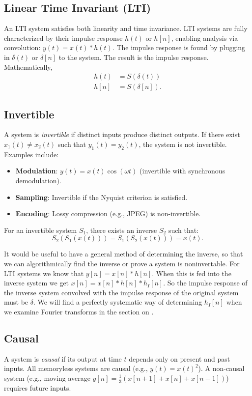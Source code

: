\subsection{Linear Time Invariant (LTI)}
An LTI system satisfies both linearity and time invariance.
LTI systems are fully characterized by their impulse response
\( h(t) \) or \( h[n] \), enabling analysis via convolution:
\( y(t) = x(t) * h(t) \). The impulse response is found by
plugging in $\delta(t)$ or $\delta[n]$ to the system. The result
is the impulse response. Mathematically,
\begin{align}
    h(t) & = S(\delta(t))  \\
    h[n] & = S(\delta[n]).
\end{align}

\subsection{Invertible}
A system is \emph{invertible} if distinct inputs produce distinct outputs. If there exist \( x_1(t) \neq x_2(t) \) such that \( y_1(t) = y_2(t) \), the system is not invertible. Examples include:
\begin{itemize}
    \item \textbf{Modulation}: \( y(t) = x(t)\cos(\omega t) \) (invertible with synchronous demodulation).
    \item \textbf{Sampling}: Invertible if the Nyquist criterion is satisfied.
    \item \textbf{Encoding}: Lossy compression (e.g., JPEG) is non-invertible.
\end{itemize}
For an invertible system \( S_1 \), there exists an inverse \( S_2 \) such that:
\[
    S_2(S_1(x(t))) = S_1(S_2(x(t))) = x(t).
\]

It would be useful to have a general method of determining the inverse,
so that we can algorithmically find the inverse or prove a system is
noninvertable. For LTI systems we know that $y[n] = x[n] * h[n]$. When
this is fed into the inverse system we get $x[n] = x[n] * h[n] * h_I[n]$.
So the impulse response of the inverse system convolved with the
impulse response of the original system must be $\delta$. We will find a
perfectly systematic way of determining $h_I[n]$ when we examine Fourier
transforms in the section on .

\subsection{Causal}
A system is \emph{causal} if its output at time \( t \) depends
only on present and past inputs. All memoryless systems are causal
(e.g., \( y(t) = x(t)^2 \)). A non-causal system (e.g., moving average
\( y[n] = \frac{1}{3}(x[n+1] + x[n] + x[n-1]) \)) requires future inputs.

